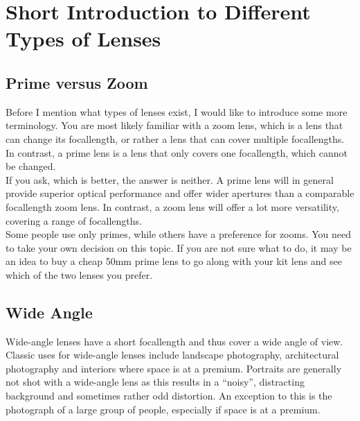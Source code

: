 \section{Short Introduction to Different Types of Lenses}
\label{sec:Introduction-Types-Lenses}

\subsection{Prime versus Zoom}
\label{subsec:Prime-versus-Zoom}

Before I mention what types of lenses exist, I would like to introduce some more terminology. You are most likely familiar with a \gls{zoom} lens, which is a lens that can change its \gls{focallength}, or rather a lens that can cover multiple \glspl{focallength}.
\\[\baselineskip]
In contrast, a \gls{prime} lens is a lens that only covers one \gls{focallength}, which cannot be changed.
\\[\baselineskip]
If you ask, which is better, the answer is neither. A \gls{prime} lens will in general provide superior optical performance and offer wider apertures than a comparable \gls{focallength} \gls{zoom} lens. In contrast, a \gls{zoom} lens will offer a lot more versatility, covering a range of \glspl{focallength}.
\\
Some people use only \glspl{prime}, while others have a preference for \glspl{zoom}. You need to take your own decision on this topic. If you are not sure what to do, it may be an idea to buy a cheap 50mm \gls{prime} lens to go along with your kit lens and see which of the two lenses you prefer.

\subsection{Wide Angle}

Wide-angle lenses have a short \gls{focallength} and thus cover a wide angle of view.
\\
Classic uses for wide-angle lenses include landscape photography, architectural photography and interiors where space is at a premium. Portraits are generally not shot with a wide-angle lens as this results in a ``noisy'', distracting background and sometimes rather odd distortion. An exception to this is the photograph of a large group of people, especially if space is at a premium.

